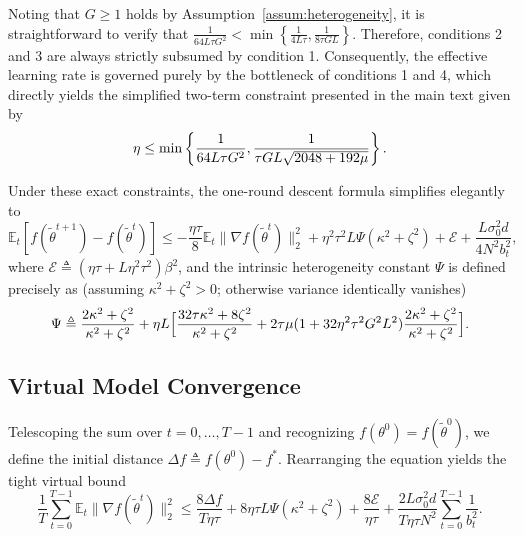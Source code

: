 \documentclass[conference]{IEEEtran}
\begin{document}
Noting that $G \ge 1$ holds by Assumption~\ref{assum:heterogeneity}, it is straightforward to verify that $\frac{1}{64L\tau G^2} < \min\left\{\frac{1}{4L\tau}, \frac{1}{8\tau G L}\right\}$. Therefore, conditions 2 and 3 are always strictly subsumed by condition 1. Consequently, the effective learning rate is governed purely by the bottleneck of conditions 1 and 4, which directly yields the simplified two-term constraint presented in the main text given by
\begin{equation}
    \eta \le \min \left\{ \frac{1}{64L\tau G^2}, \frac{1}{\tau G L\sqrt{2048+192\mu}} \right\}. \notag
\end{equation}

Under these exact constraints, the one-round descent formula simplifies elegantly to
\begin{equation}
    \mathbb{E}_t[f(\tilde{\theta}^{t+1}) - f(\tilde{\theta}^t)] \le -\frac{\eta\tau}{8}\mathbb{E}_t\|\nabla f(\tilde{\theta}^t)\|_2^2 + \eta^2\tau^2 L \Psi (\kappa^2+\zeta^2) + \mathcal{E} + \frac{L\sigma_0^2 d}{4 N^2 b_t^2},
\end{equation}
where $\mathcal{E} \triangleq (\eta\tau + L\eta^2\tau^2)\beta^2$, and the intrinsic heterogeneity constant $\Psi$ is defined precisely as (assuming $\kappa^2+\zeta^2 > 0$; otherwise variance identically vanishes)
\begin{equation}
    \Psi \triangleq \frac{2\kappa^2+\zeta^2}{\kappa^2+\zeta^2} + \eta L\Bigl[ \frac{32\tau\kappa^2+8\zeta^2}{\kappa^2+\zeta^2} + 2\tau\mu(1+32\eta^2\tau^2 G^2 L^2)\frac{2\kappa^2+\zeta^2}{\kappa^2+\zeta^2} \Bigr].
\end{equation}

\subsection{Virtual Model Convergence}
Telescoping the sum over $t=0,\dots,T-1$ and recognizing $f(\theta^0) = f(\tilde{\theta}^0)$, we define the initial distance $\Delta f \triangleq f(\theta^0) - f^\ast$. Rearranging the equation yields the tight virtual bound
\begin{equation} \label{eqn:virtual_bound}
    \frac1T\sum_{t=0}^{T-1}\mathbb{E}_t\|\nabla f(\tilde{\theta}^t)\|_2^2 \le \frac{8\Delta f}{T\eta\tau} + 8\eta\tau L \Psi(\kappa^2+\zeta^2) + \frac{8\mathcal{E}}{\eta\tau} + \frac{2L\sigma_0^2 d}{T\eta\tau N^2}\sum_{t=0}^{T-1}\frac{1}{b_t^2}.
\end{equation}
\end{document}
